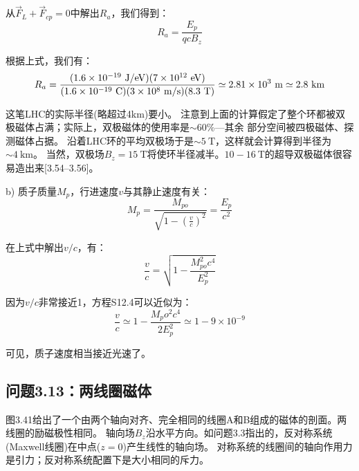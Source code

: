 从$\vec{F}_{L}+\vec{F}_{cp}=0$中解出$R_a$，我们得到：
\begin{equation*}
R_a=\frac{E_p}{q c B_z}\tag{S12.2} %
\end{equation*}

根据上式，我们有：
\begin{equation*}
R_{a}=\frac{(1.6\times 10^{-19}\ \mathrm{J/eV})(7\times 10^{12}\ \mathrm{eV})}{(1.6\times 10^{-19}\ \mathrm{C})(3\times 10^{8}\ \mathrm{m/s})(8.3\ \mathrm{T})}\\
\simeq 2.81\times 10^{3}\ \mathrm{m}\simeq 2.8\ \mathrm{km}
\end{equation*}

这笔LHC的实际半径(略超过4km)要小。
注意到上面的计算假定了整个环都被双极磁体占满；实际上，双极磁体的使用率是$\sim 60\%$---其余
部分空间被四极磁体、探测磁体占据。
沿着LHC环的平均双极场于是$\sim 5\ \mathrm{T}$，这样就会计算得到半径为$\sim 4\ \mathrm{km}$。
当然，双极场$B_z=15\ \mathrm{T}$将使环半径减半。$10-16\ \mathrm{T}$的超导双极磁体很容易造出来[3.54–3.56]。

b) 质子质量$M_p$，行进速度$v$与其静止速度有关：
\begin{equation*}
M_{p}=\frac{M_{po}}{\sqrt{1-(\frac{v}{c})^{2}}}=\frac{E_{p}}{c^{2}}\tag{S12.3}%
\end{equation*}

在上式中解出$v/c$，有：
\begin{equation*}
\frac{v}{c}=\sqrt{1-\frac{M_{po}^{2}c^{4}}{E_{p}^{2}}}\tag{S12.4}
\end{equation*}

因为$v/c$非常接近1，方程S12.4可以近似为：
\begin{equation*}
\frac{v}{c}\simeq 1-\frac{M_po^2 c^4}{2E_p^2}\simeq 1-9\times 10^{-9}
\end{equation*}

可见，质子速度相当接近光速了。



\subsection{问题3.13：两线圈磁体}
图3.41给出了一个由两个轴向对齐、完全相同的线圈A和B组成的磁体的剖面。两线圈的励磁极性相同。
轴向场$B_z$沿水平方向。如问题3.3指出的，反对称系统(Maxwell线圈)在中点($z=0$)产生线性的轴向场。
对称系统的线圈间的轴向作用力是引力；反对称系统配置下是大小相同的斥力。

